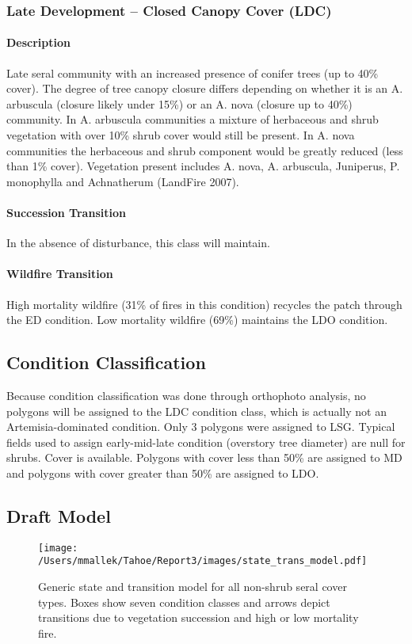 \noindent\hrulefill


\subsubsection{Late Development – Closed Canopy Cover (LDC)} 

\paragraph{Description} Late seral community with an increased presence of conifer trees (up to 40\% cover). The degree of tree canopy closure differs depending on whether it is an A. arbuscula (closure likely under 15\%) or an A. nova (closure up to 40\%) community. In A. arbuscula communities a mixture of herbaceous and shrub vegetation with over 10\% shrub cover would still be present. In A. nova communities the herbaceous and shrub component would be greatly reduced (less than 1\% cover). Vegetation present includes A. nova, A. arbuscula, Juniperus, P. monophylla and Achnatherum (LandFire 2007).

\paragraph{Succession Transition} In the absence of disturbance, this class will maintain. 

\paragraph{Wildfire Transition} High mortality wildfire (31\% of fires in this condition) recycles the patch through the ED condition. Low mortality wildfire (69\%) maintains the LDO condition.

\noindent\hrulefill

\subsection*{Condition Classification}
Because condition classification was done through orthophoto analysis, no polygons will be assigned to the LDC condition class, which is actually not an Artemisia-dominated condition. Only 3 polygons were assigned to LSG. Typical fields used to assign early-mid-late condition (overstory tree diameter) are null for shrubs. Cover is available. Polygons with cover less than 50\% are assigned to MD and polygons with cover greater than 50\% are assigned to LDO.

\subsection*{Draft Model}
\begin{figure}[htbp]
\centering
\texttt{[image: /Users/mmallek/Tahoe/Report3/images/state\_trans\_model.pdf]}
\caption{Generic state and transition model for all non-shrub seral cover types. Boxes show seven condition classes and arrows depict transitions due to vegetation succession and high or low mortality fire.} 
\label{lsg_transmodel}
\end{figure}

